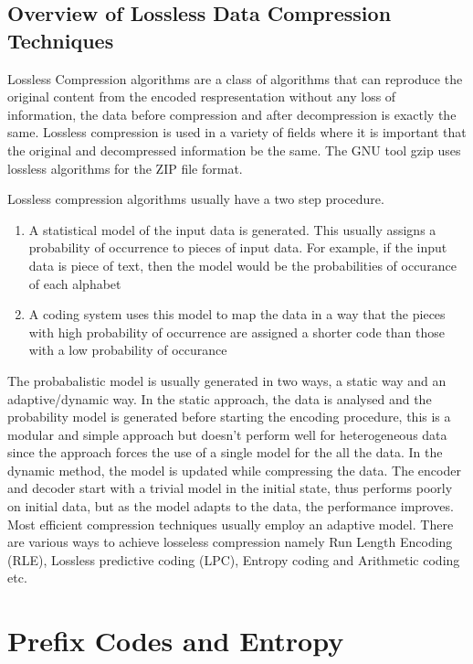 \documentclass{article}
\begin{document}
\subsection{Overview of Lossless Data Compression Techniques}

Lossless Compression algorithms are a class of algorithms that can reproduce the original content from the encoded respresentation without any loss of information, the data before compression and after decompression is exactly the same. Lossless compression is used in a variety of fields where it is important that the original and decompressed information be the same. The GNU tool gzip uses lossless algorithms for the ZIP file format.

Lossless compression algorithms usually have a two step procedure. 
\begin{enumerate}
	\item A statistical model of the input data is generated. This usually assigns a probability of occurrence to pieces of input data. For example, if the input data is piece of text, then the model would be the probabilities of occurance of each alphabet
	
	\item A coding system uses this model to map the data in a way that the pieces with high probability of occurrence are assigned a shorter code than those with a low probability of occurance
\end{enumerate}

The probabalistic model is usually generated in two ways, a static way and an adaptive/dynamic way. In the static approach, the data is analysed and the probability model is generated before starting the encoding procedure, this is a modular and simple approach but doesn't perform well for heterogeneous data since the approach forces the use of a single model for the all the data. In the dynamic method, the model is updated while compressing the data. The encoder and decoder start with a trivial model in the initial state, thus performs poorly on initial data, but as the model adapts to the data, the performance improves. Most efficient compression techniques usually employ an adaptive model. There are various ways to achieve losseless compression namely Run Length Encoding (RLE), Lossless predictive coding (LPC), Entropy coding and Arithmetic coding etc.\cite{parekar2014lossless}\cite{yellamma2012performance}

\section{Prefix Codes and Entropy}
\end{document}
